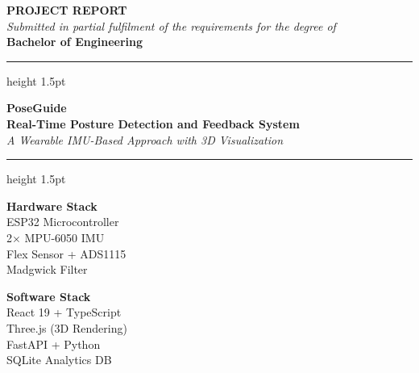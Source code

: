 \documentclass[12pt,a4paper]{report}
\begin{document}
\begin{titlepage}
    \centering
    \vspace*{0.5cm}

    {\Large \textbf{PROJECT REPORT}}\\[0.3cm]
    {\normalsize \textit{Submitted in partial fulfilment of the requirements for the degree of}}\\[0.2cm]
    {\normalsize \textbf{Bachelor of Engineering}}\\[0.5cm]
    \hrule height 1.5pt
    \vspace{0.4cm}

    {\Huge \textbf{\textcolor{primaryblue}{PoseGuide}}}\\[0.5cm]
    {\LARGE \textbf{Real-Time Posture Detection and Feedback System}}\\[0.3cm]
    {\large \textit{A Wearable IMU-Based Approach with 3D Visualization}}\\[0.4cm]

    \hrule height 1.5pt
    \vspace{1.2cm}

    \begin{minipage}{0.42\textwidth}
        \centering
        \begin{mdframed}[linecolor=primaryblue, linewidth=1.5pt, innertopmargin=10pt, innerbottommargin=10pt]
        \centering
        \textbf{Hardware Stack}\\[4pt]
        \textcolor{sectiongray}{ESP32 Microcontroller}\\
        \textcolor{sectiongray}{2$\times$ MPU-6050 IMU}\\
        \textcolor{sectiongray}{Flex Sensor + ADS1115}\\
        \textcolor{sectiongray}{Madgwick Filter}
        \end{mdframed}
    \end{minipage}
    \hfill
    \begin{minipage}{0.42\textwidth}
        \centering
        \begin{mdframed}[linecolor=accentviolet, linewidth=1.5pt, innertopmargin=10pt, innerbottommargin=10pt]
        \centering
        \textbf{Software Stack}\\[4pt]
        \textcolor{sectiongray}{React 19 + TypeScript}\\
        \textcolor{sectiongray}{Three.js (3D Rendering)}\\
        \textcolor{sectiongray}{FastAPI + Python}\\
        \textcolor{sectiongray}{SQLite Analytics DB}
        \end{mdframed}
    \end{minipage}


\end{titlepage}
\end{document}
